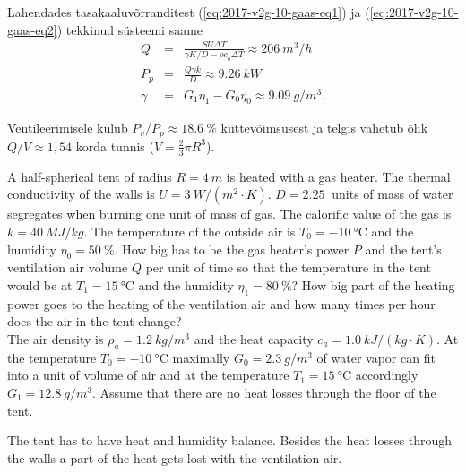 Lahendades tasakaaluvõrranditest (\ref{eq:2017-v2g-10-gaas-eq1}) ja (\ref{eq:2017-v2g-10-gaas-eq2})
tekkinud süsteemi saame
\vspace{-3pt}
\begin{eqnarray*}
	Q & = & \frac{SU\Delta T}{\gamma K/D-\rho c_{\tilde{o}}\Delta T}\approx\SI{206}{m^{3}/h}\\
	P_{p} & = & \frac{Q\gamma k}{D}\approx\SI{9.26}{kW}\\
	\gamma & = & G_{1}\eta_{1}-G_{0}\eta_{0}\approx\SI{9.09}{g/m^{3}}.
\end{eqnarray*}


Ventileerimisele kulub $P_{v}/P_{p}\approx\SI{18.6}{\percent}$ küttevõimsusest
ja telgis vahetub õhk $Q/V\approx1,54$ korda tunnis ($V=\frac{2}{3}\pi R^{3}$).

A half-spherical tent of radius $R=\SI{4}{m}$ is heated with a gas heater. The thermal conductivity of the walls is $U=\SI{3}{W/(m^{2}\cdot K)}$. $D=\SI{2.25}{}$ units of mass of water segregates when burning one unit of mass of gas. The calorific value of the gas is $k=\SI{40}{MJ/kg}$. The temperature of the outside air is $T_{0}=\SI{-10}{\degreeCelsius}$ and the humidity $\eta_{0}=\SI{50}{\percent}$. How big has to be the gas heater’s power $P$ and the tent’s ventilation air volume $Q$ per unit of time so that the temperature in the tent would be at $T_{1}=\SI{15}{\degreeCelsius}$ and the humidity $\eta_{1}=\SI{80}{\percent}$? How big part of the heating power goes to the heating of the ventilation air and how many times per hour does the air in the tent change?\\
The air density is $\rho_{a}=\SI{1.2}{kg/m^{3}}$ and the heat capacity $c_{a}=\SI{1.0}{kJ/(kg\cdot K)}$. At the temperature $T_{0}=\SI{-10}{\degreeCelsius}$ maximally $G_{0}=\SI{2.3}{g/m^{3}}$ of water vapor can fit into a unit of volume of air and at the temperature $T_{1}=\SI{15}{\degreeCelsius}$ accordingly $G_{1}=\SI{12.8}{g/m^{3}}$. Assume that there are no heat losses through the floor of the tent.

\hinteng
The tent has to have heat and humidity balance. Besides the heat losses through the walls a part of the heat gets lost with the ventilation air.

